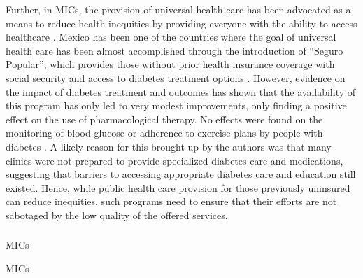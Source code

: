 Further, in \acp{MIC}, the provision of universal health care has been advocated as a means to reduce health inequities by providing everyone with the ability to access healthcare \parencite{Marmot2008}.  Mexico has been one of the countries where the goal of universal health care has been almost accomplished through the introduction of ``Seguro Popular'', which provides those without prior health insurance coverage with social security and access to diabetes treatment options \parencite{Knaul2012,Rivera-Hernandez2016}. However, evidence on the impact of diabetes treatment and outcomes has shown that the availability of this program has only led to very modest improvements, only finding a positive effect on the use of pharmacological therapy. No effects were found on the monitoring of blood glucose or adherence to exercise plans by people with diabetes \parencite{Rivera-Hernandez2016}. A likely reason for this brought up by the authors was that many clinics were not prepared to provide specialized diabetes care and medications, suggesting that barriers to accessing appropriate diabetes care and education still existed. Hence, while public health care provision for those previously uninsured can reduce inequities, such programs need to ensure that their efforts are not sabotaged by the low quality of the offered services.


\DIFaddbegin \subsubsection{}

\acp{MIC} 

\acp{MIC}

